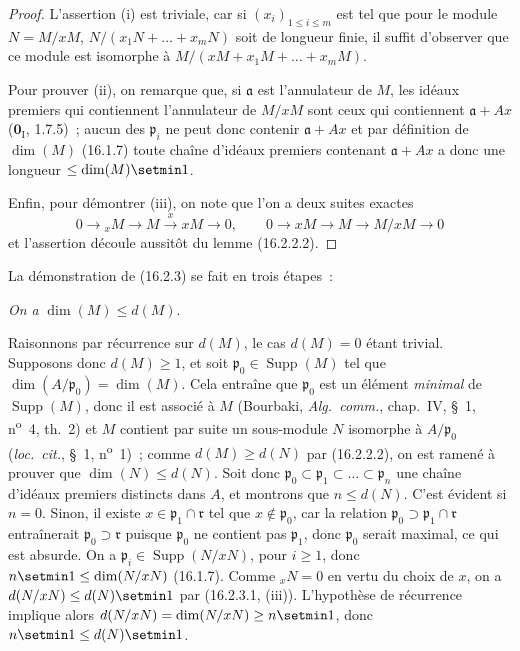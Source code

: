 \begin{proof}
L'assertion (i) est triviale, car si $(x_i)_{1\leq i\leq m}$ est tel que pour
le module $N=M/xM$, $N/(x_1N+\ldots+x_mN)$ soit de longueur finie, il suffit
d'observer que ce module est isomorphe à
$M/(xM+x_1M+\ldots+x_mM)$.

Pour prouver (ii), on remarque que, si $\mathfrak{a}$ est l'annulateur de
$M$, les idéaux premiers qui contiennent l'annulateur de $M/xM$ sont ceux qui
contiennent $\mathfrak{a}+Ax$ ($\mathbf{0}_{\mathrm I}$, 1.7.5)~; aucun des
$\mathfrak{p}_i$ ne peut donc contenir $\mathfrak{a}+Ax$ et par définition de
$\dim(M)$ (16.1.7) toute chaîne d'idéaux premiers contenant
$\mathfrak{a}+Ax$ a donc une longueur $\leq\dim(M)\setmin 1$.


Enfin, pour démontrer (iii), on note que l'on a deux suites exactes
\[
  0\to{}_xM\to M\xrightarrow{x}xM\to0,\qquad
  0\to xM\to M\to M/xM\to0
\]
et l'assertion découle aussitôt du lemme (16.2.2.2).
\end{proof}

La démonstration de (16.2.3) se fait en trois étapes~:

\begin{env}[16.2.3.2]
\label{0.16.2.3.2-fr}
\emph{On a} $\dim(M)\leq d(M)$.
\end{env}

Raisonnons par récurrence sur $d(M)$, le cas $d(M)=0$ étant trivial.
Supposons donc $d(M)\geq1$, et soit $\mathfrak{p}_0\in\operatorname{Supp}(M)$
tel que $\dim(A/\mathfrak{p}_0)=\dim(M)$. Cela entraîne que
$\mathfrak{p}_0$ est un élément \emph{minimal} de $\operatorname{Supp}(M)$,
donc il est associé à $M$ (Bourbaki, \emph{Alg.~comm.}, chap.~IV, \S~1,
n\textsuperscript{o}~4, th.~2) et $M$ contient par suite un sous-module $N$ isomorphe à
$A/\mathfrak{p}_0$ (\emph{loc.~cit.}, \S~1, n\textsuperscript{o}~1)~; comme $d(M)\geq d(N)$
par (16.2.2.2), on est ramené à prouver que $\dim(N)\leq d(N)$. Soit donc
$\mathfrak{p}_0\subset\mathfrak{p}_1\subset\ldots\subset\mathfrak{p}_n$ une
chaîne d'idéaux premiers distincts dans $A$, et montrons que $n\leq d(N)$.
C'est évident si $n=0$. Sinon, il existe
$x\in\mathfrak{p}_1\cap\mathfrak{r}$ tel que $x\notin\mathfrak{p}_0$, car la
relation $\mathfrak{p}_0\supset\mathfrak{p}_1\cap\mathfrak{r}$ entraînerait
$\mathfrak{p}_0\supset\mathfrak{r}$ puisque $\mathfrak{p}_0$ ne contient pas
$\mathfrak{p}_1$, donc $\mathfrak{p}_0$ serait maximal, ce qui est absurde.
On a $\mathfrak{p}_i\in\operatorname{Supp}(N/xN)$, pour $i\geq1$, donc
$n\setmin 1\leq\dim(N/xN)$ (16.1.7). Comme ${}_xN=0$ en vertu du choix de $x$, on a
$d(N/xN)\leq d(N)\setmin 1$ par (16.2.3.1, (iii)). L'hypothèse de récurrence implique
alors $d(N/xN)=\dim(N/xN)\geq n\setmin 1$, donc $n\setmin 1\leq d(N)\setmin 1$.


